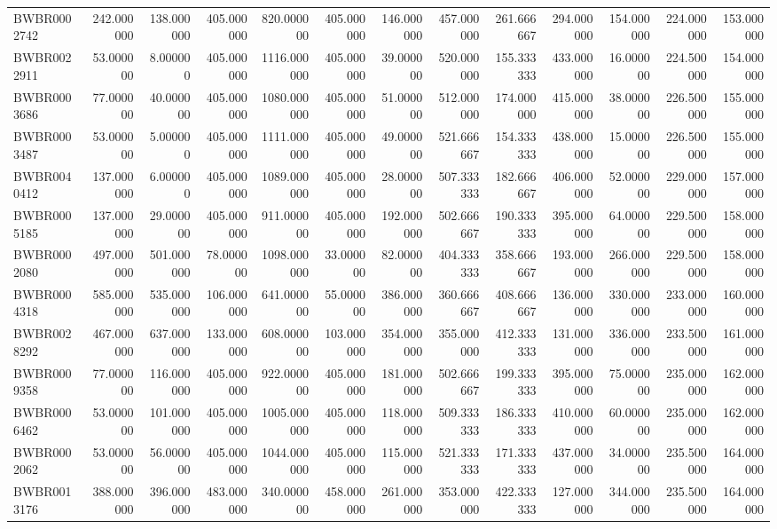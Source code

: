 \begin{longtable}{lrrrrrrrrrrrr}
BWBR0002742 & 242.000000 & 138.000000 & 405.000000 & 820.000000 & 405.000000 & 146.000000 & 457.000000 & 261.666667 & 294.000000 & 154.000000 & 224.000000 & 153.000000 \\
BWBR0022911 & 53.000000 & 8.000000 & 405.000000 & 1116.000000 & 405.000000 & 39.000000 & 520.000000 & 155.333333 & 433.000000 & 16.000000 & 224.500000 & 154.000000 \\
BWBR0003686 & 77.000000 & 40.000000 & 405.000000 & 1080.000000 & 405.000000 & 51.000000 & 512.000000 & 174.000000 & 415.000000 & 38.000000 & 226.500000 & 155.000000 \\
BWBR0003487 & 53.000000 & 5.000000 & 405.000000 & 1111.000000 & 405.000000 & 49.000000 & 521.666667 & 154.333333 & 438.000000 & 15.000000 & 226.500000 & 155.000000 \\
BWBR0040412 & 137.000000 & 6.000000 & 405.000000 & 1089.000000 & 405.000000 & 28.000000 & 507.333333 & 182.666667 & 406.000000 & 52.000000 & 229.000000 & 157.000000 \\
BWBR0005185 & 137.000000 & 29.000000 & 405.000000 & 911.000000 & 405.000000 & 192.000000 & 502.666667 & 190.333333 & 395.000000 & 64.000000 & 229.500000 & 158.000000 \\
BWBR0002080 & 497.000000 & 501.000000 & 78.000000 & 1098.000000 & 33.000000 & 82.000000 & 404.333333 & 358.666667 & 193.000000 & 266.000000 & 229.500000 & 158.000000 \\
BWBR0004318 & 585.000000 & 535.000000 & 106.000000 & 641.000000 & 55.000000 & 386.000000 & 360.666667 & 408.666667 & 136.000000 & 330.000000 & 233.000000 & 160.000000 \\
BWBR0028292 & 467.000000 & 637.000000 & 133.000000 & 608.000000 & 103.000000 & 354.000000 & 355.000000 & 412.333333 & 131.000000 & 336.000000 & 233.500000 & 161.000000 \\
BWBR0009358 & 77.000000 & 116.000000 & 405.000000 & 922.000000 & 405.000000 & 181.000000 & 502.666667 & 199.333333 & 395.000000 & 75.000000 & 235.000000 & 162.000000 \\
BWBR0006462 & 53.000000 & 101.000000 & 405.000000 & 1005.000000 & 405.000000 & 118.000000 & 509.333333 & 186.333333 & 410.000000 & 60.000000 & 235.000000 & 162.000000 \\
BWBR0002062 & 53.000000 & 56.000000 & 405.000000 & 1044.000000 & 405.000000 & 115.000000 & 521.333333 & 171.333333 & 437.000000 & 34.000000 & 235.500000 & 164.000000 \\
BWBR0013176 & 388.000000 & 396.000000 & 483.000000 & 340.000000 & 458.000000 & 261.000000 & 353.000000 & 422.333333 & 127.000000 & 344.000000 & 235.500000 & 164.000000 \\

\end{longtable}
